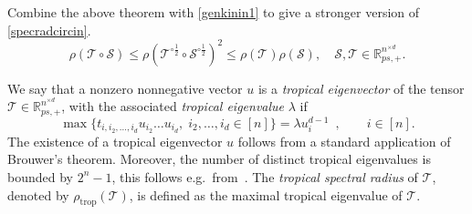 \documentclass{amsart}
\newcommand{\R}{\mathbb{R}}
\newcommand{\0}{\mathbf{0}}
\newcommand{\1}{\mathbf{1}}
\newcommand{\cS}{\mathcal{S}}
\newcommand{\cT}{\mathcal{T}}
\newcommand{\trop}{\mathrm{trop}}
\theoremstyle{remark}
\numberwithin{equation}{section} %
\renewcommand{\le}{\leqslant}
\begin{document}
 Combine the above theorem with \eqref{genkinin1} to give a stronger version of \eqref{specradcircin}.
 \begin{equation}\label{specradcircinsv}
 \rho(\cT\circ\cS)\le \rho(\cT^{\circ \frac{1}{2}}\circ\cS^{\circ \frac{1}{2}})^2\le \rho(\cT)\rho(\cS), \quad \cS,\cT\in \R_{ps,+}^{n^{\times d}}.
 \end{equation}

We say that a nonzero nonnegative vector $u$ is a \emph{tropical eigenvector}
of the tensor $\cT\in\R_{ps,+}^{n^{\times d}}$, with the associated \emph{tropical eigenvalue} $\lambda$ if
%
%
\[
\max\{t_{i,i_2,\ldots,i_d}u_{i_2}\ldots u_{i_d},\;i_2,\ldots,i_d\in[n]\} = 
\lambda u_i^{d-1} \enspace,\qquad i\in [n] .
\]
The existence of a tropical eigenvector $u$ follows from a standard
application of Brouwer's theorem. Moreover, the number of distinct
tropical eigenvalues is bounded by $2^n-1$, this follows e.g.\ from~\cite[Th.~5.2.3]{nussbaumlemmens}.  The \emph{tropical spectral radius} of $\cT$, denoted by $\rho_{\trop}(\cT)$,
is defined as the maximal tropical eigenvalue of $\cT$.

%
\end{document}
